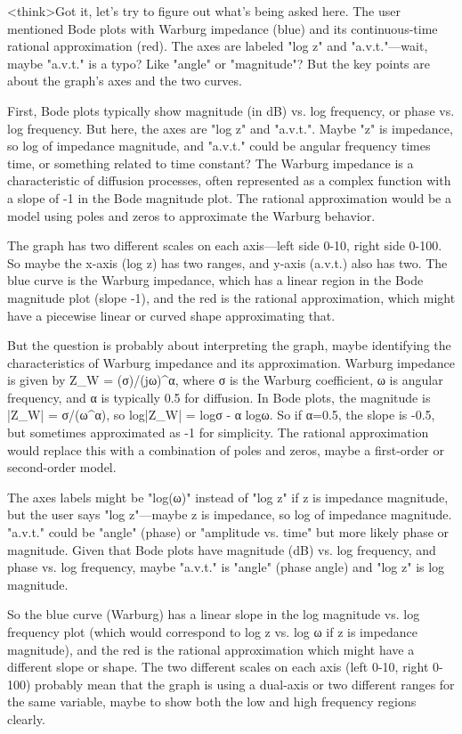 <think>Got it, let's try to figure out what's being asked here. The user mentioned Bode plots with Warburg impedance (blue) and its continuous-time rational approximation (red). The axes are labeled "log z" and "a.v.t."—wait, maybe "a.v.t." is a typo? Like "angle" or "magnitude"? But the key points are about the graph's axes and the two curves. 

First, Bode plots typically show magnitude (in dB) vs. log frequency, or phase vs. log frequency. But here, the axes are "log z" and "a.v.t.". Maybe "z" is impedance, so log of impedance magnitude, and "a.v.t." could be angular frequency times time, or something related to time constant? The Warburg impedance is a characteristic of diffusion processes, often represented as a complex function with a slope of -1 in the Bode magnitude plot. The rational approximation would be a model using poles and zeros to approximate the Warburg behavior.

The graph has two different scales on each axis—left side 0-10, right side 0-100. So maybe the x-axis (log z) has two ranges, and y-axis (a.v.t.) also has two. The blue curve is the Warburg impedance, which has a linear region in the Bode magnitude plot (slope -1), and the red is the rational approximation, which might have a piecewise linear or curved shape approximating that. 

But the question is probably about interpreting the graph, maybe identifying the characteristics of Warburg impedance and its approximation. Warburg impedance is given by Z_W = (σ)/(jω)^α, where σ is the Warburg coefficient, ω is angular frequency, and α is typically 0.5 for diffusion. In Bode plots, the magnitude is |Z_W| = σ/(ω^α), so log|Z_W| = logσ - α logω. So if α=0.5, the slope is -0.5, but sometimes approximated as -1 for simplicity. The rational approximation would replace this with a combination of poles and zeros, maybe a first-order or second-order model.

The axes labels might be "log(ω)" instead of "log z" if z is impedance magnitude, but the user says "log z"—maybe z is impedance, so log of impedance magnitude. "a.v.t." could be "angle" (phase) or "amplitude vs. time" but more likely phase or magnitude. Given that Bode plots have magnitude (dB) vs. log frequency, and phase vs. log frequency, maybe "a.v.t." is "angle" (phase angle) and "log z" is log magnitude. 

So the blue curve (Warburg) has a linear slope in the log magnitude vs. log frequency plot (which would correspond to log z vs. log ω if z is impedance magnitude), and the red is the rational approximation which might have a different slope or shape. The two different scales on each axis (left 0-10, right 0-100) probably mean that the graph is using a dual-axis or two different ranges for the same variable, maybe to show both the low and high frequency regions clearly.

